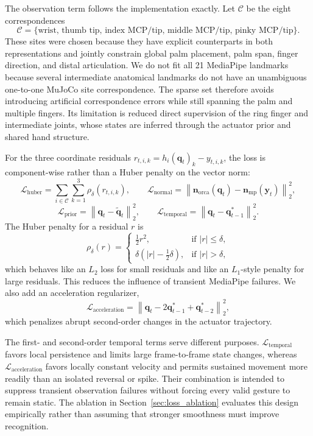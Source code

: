 \documentclass[11pt]{article}
\begin{document}
The observation term follows the implementation exactly. Let $\mathcal{C}$ be the eight correspondences
\[
\mathcal{C}=\{\text{wrist, thumb tip, index MCP/tip, middle MCP/tip, pinky MCP/tip}\}.
\]
These sites were chosen because they have explicit counterparts in both representations and jointly constrain global palm placement, palm span, finger direction, and distal articulation. We do not fit all 21 MediaPipe landmarks because several intermediate anatomical landmarks do not have an unambiguous one-to-one MuJoCo site correspondence. The sparse set therefore avoids introducing artificial correspondence errors while still spanning the palm and multiple fingers. Its limitation is reduced direct supervision of the ring finger and intermediate joints, whose states are inferred through the actuator prior and shared hand structure.

For the three coordinate residuals $r_{t,i,k}=h_i(\mathbf q_t)_k-y_{t,i,k}$, the loss is component-wise rather than a Huber penalty on the vector norm:
\[
\mathcal{L}_{\text{huber}}
=
\sum_{i\in\mathcal C}\sum_{k=1}^{3}\rho_\delta(r_{t,i,k}),
\qquad
\mathcal{L}_{\text{normal}}
=
\left\| \mathbf{n}_{\text{orca}}(\mathbf{q}_t) - \mathbf{n}_{\text{mp}}(\mathbf{y}_t) \right\|_2^2,
\]
\[
\mathcal{L}_{\text{prior}}
=
\left\| \mathbf{q}_t - \tilde{\mathbf{q}}_t \right\|_2^2,
\qquad
\mathcal{L}_{\text{temporal}}
=
\left\| \mathbf{q}_t - \mathbf{q}_{t-1}^* \right\|_2^2.
\]
The Huber penalty for a residual $r$ is \cite{huber1964robust}
\[
\rho_{\delta}(r)
=
\begin{cases}
\tfrac{1}{2} r^2, & \text{if } \lvert r \rvert \le \delta, \\
\delta \left(\lvert r \rvert - \tfrac{1}{2}\delta\right), & \text{if } \lvert r \rvert > \delta,
\end{cases}
\]
which behaves like an $L_2$ loss for small residuals and like an $L_1$-style penalty for large residuals. This reduces the influence of transient MediaPipe failures. We also add an acceleration regularizer,
\[
\mathcal{L}_{\text{acceleration}}
=
\left\| \mathbf{q}_t - 2\mathbf{q}_{t-1}^* + \mathbf{q}_{t-2}^* \right\|_2^2,
\]
which penalizes abrupt second-order changes in the actuator trajectory.

The first- and second-order temporal terms serve different purposes. $\mathcal L_{\text{temporal}}$ favors local persistence and limits large frame-to-frame state changes, whereas $\mathcal L_{\text{acceleration}}$ favors locally constant velocity and permits sustained movement more readily than an isolated reversal or spike. Their combination is intended to suppress transient observation failures without forcing every valid gesture to remain static. The ablation in Section~\ref{sec:loss_ablation} evaluates this design empirically rather than assuming that stronger smoothness must improve recognition.
\end{document}
